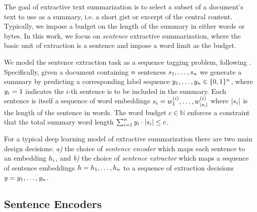 The goal of extractive text summarization is to select a subset of a 
document's text to use as a summary, i.e. a short gist or excerpt of the 
central content.
Typically, we impose a budget on the length of the summary in either 
words or bytes. In this work, we focus on \textit{sentence} extractive 
summarization, 
where the basic unit of extraction is a sentence and impose a word limit as 
the budget.

We model the sentence extraction task as a sequence tagging problem, 
following \cite{conroy2001text}. 
Specifically, given a document containing $n$ sentences 
$\sent_1, \ldots, \sent_{\docSize}$ we generate a summary by predicting a 
corresponding label sequence $\slabel_1, \ldots, \slabel_{\docSize} 
\in \{0, 1\}^{\docSize}$, where $\slabel_i = 1$ 
indicates the $i$-th sentence is to be included in the summary.
Each sentence is itself a sequence of word embeddings 
$\sent[i] = \wordEmb[1]^{(i)}, \ldots, \wordEmb[{|\sent[i]|}]^{(i)}$ where
$|\sent[i]|$ is the length of the sentence in words.
The word budget $c \in \mathbb{N}$ 
enforces a constraint that the total summary word length 
$\sum_{i=1}^\docSize \slabel_i \cdot |\sent[i]| \le c$.








For a typical deep learning model of extractive 
summarization there are two main design decisions:
\textit{a)}  the choice of \textit{sentence encoder} 
which maps each sentence \sent[i] 
to an embedding $\sentEmb[i]$, 
and 
\textit{b)} the choice of \textit{sentence extractor} 
which maps a sequence of sentence embeddings 
$\sentEmb = \sentEmb[1],\ldots, \sentEmb[\docSize]$  
to a sequence of extraction
decisions $\slabel = \slabel_1,\ldots,\slabel_{\docSize}$.









\subsection{Sentence Encoders} \label{sec:senc}



